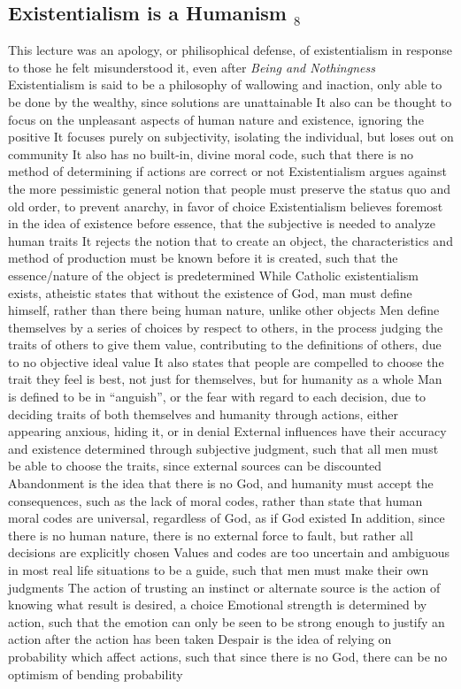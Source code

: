 \documentclass[11 pt, twoside]{article}
\newenvironment{outline*}
{
	\begin{outline}[enumerate]
	}
	{\end{outline}
}
\newcommand{\foota}[1]{\hyperlink{#1}{$_#1$}}
\begin{document}
\subsection{Existentialism is a Humanism \foota{8}}
\begin{outline*}
\1 This lecture was an apology, or philisophical defense, of existentialism in response to those he felt misunderstood it, even after \textit{Being and Nothingness}
\1 Existentialism is said to be a philosophy of wallowing and inaction, only able to be done by the wealthy, since solutions are unattainable
\2 It also can be thought to focus on the unpleasant aspects of human nature and existence, ignoring the positive
\2 It focuses purely on subjectivity, isolating the individual, but loses out on community
\2 It also has no built-in, divine moral code, such that there is no method of determining if actions are correct or not
\1 Existentialism argues against the more pessimistic general notion that people must preserve the status quo and old order, to prevent anarchy, in favor of choice
\1 Existentialism believes foremost in the idea of existence before essence, that the subjective is needed to analyze human traits
\2 It rejects the notion that to create an object, the characteristics and method of production must be known before it is created, such that the essence/nature of the object is predetermined
\2 While Catholic existentialism exists, atheistic states that without the existence of God, man must define himself, rather than there being human nature, unlike other objects
\2 Men define themselves by a series of choices by respect to others, in the process judging the traits of others to give them value, contributing to the definitions of others, due to no objective ideal value
\2 It also states that people are compelled to choose the trait they feel is best, not just for themselves, but for humanity as a whole
\1 Man is defined to be in ``anguish'', or the fear with regard to each decision, due to deciding traits of both themselves and humanity through actions, either appearing anxious, hiding it, or in denial
\2 External influences have their accuracy and existence determined through subjective judgment, such that all men must be able to choose the traits, since external sources can be discounted
\1 Abandonment is the idea that there is no God, and humanity must accept the consequences, such as the lack of moral codes, rather than state that human moral codes are universal, regardless of God, as if God existed
\2 In addition, since there is no human nature, there is no external force to fault, but rather all decisions are explicitly chosen
\2 Values and codes are too uncertain and ambiguous in most real life situations to be a guide, such that men must make their own judgments
\2 The action of trusting an instinct or alternate source is the action of knowing what result is desired, a choice
\2 Emotional strength is determined by action, such that the emotion can only be seen to be strong enough to justify an action after the action has been taken
\1 Despair is the idea of relying on probability which affect actions, such that since there is no God, there can be no optimism of bending probability
\2 
\end{outline*}
\end{document}
